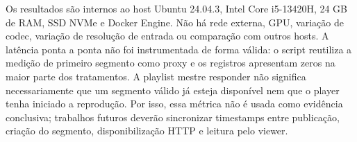 Os resultados são internos ao host Ubuntu 24.04.3, Intel Core i5-13420H, 24 GB de RAM, SSD NVMe e Docker Engine. Não há rede externa, GPU, variação de codec, variação de resolução de entrada ou comparação com outros hosts. A latência ponta a ponta não foi instrumentada de forma válida: o script reutiliza a medição de primeiro segmento como proxy e os registros apresentam zeros na maior parte dos tratamentos. A playlist mestre responder não significa necessariamente que um segmento válido já esteja disponível nem que o player tenha iniciado a reprodução. Por isso, essa métrica não é usada como evidência conclusiva; trabalhos futuros deverão sincronizar timestamps entre publicação, criação do segmento, disponibilização HTTP e leitura pelo viewer.
